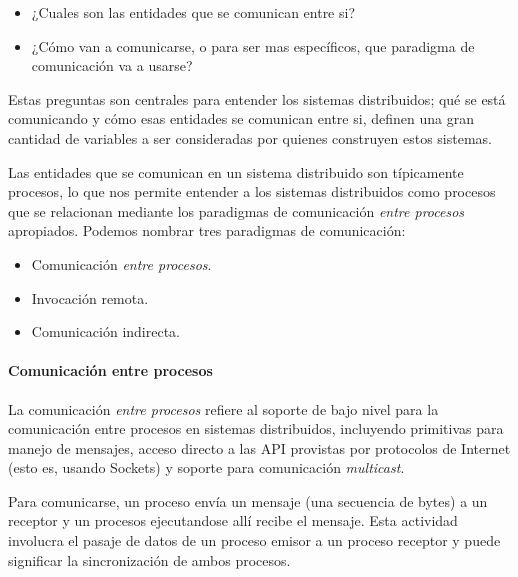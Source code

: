 \documentclass[a4paper,10pt, oneside]{article}
\begin{document}
\begin{itemize}
	\item ¿Cuales son las entidades que se comunican entre si?
	\item ¿Cómo van a comunicarse, o para ser mas específicos, que paradigma de comunicación va a usarse?
\end{itemize}

Estas preguntas son centrales para entender los sistemas distribuidos; qué se está comunicando y cómo esas entidades se comunican entre si, definen una gran cantidad de variables a ser consideradas por quienes construyen estos sistemas.

Las entidades que se comunican en un sistema distribuido son típicamente procesos, lo que nos permite entender a los sistemas distribuidos como procesos que se relacionan mediante los paradigmas de comunicación \textit{entre procesos} apropiados. Podemos nombrar tres paradigmas de comunicación:

\begin{itemize}
	\item Comunicación \textit{entre procesos}.
	\item Invocación remota.
	\item Comunicación indirecta.
\end{itemize}

\paragraph{Comunicación entre procesos}
La comunicación \textit{entre procesos} refiere al soporte de bajo nivel para la comunicación entre procesos en sistemas distribuidos, incluyendo primitivas para manejo de mensajes, acceso directo a las API provistas por protocolos de Internet (esto es, usando Sockets) y soporte para comunicación \textit{multicast}.

Para comunicarse, un proceso envía un mensaje (una secuencia de bytes) a un receptor y un procesos ejecutandose allí recibe el mensaje. Esta actividad involucra el pasaje de datos de un proceso emisor a un proceso receptor y puede significar la sincronización de ambos procesos.
\end{document}
